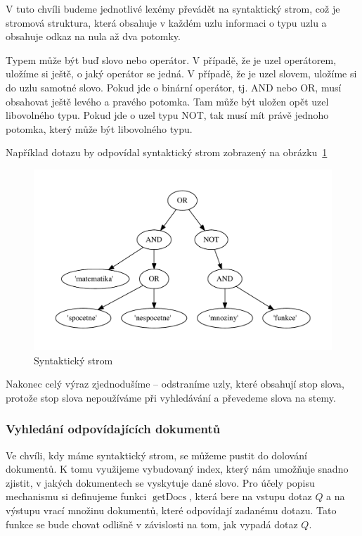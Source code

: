 \documentclass[12pt]{article}
\newcommand{\sssection}[1]{\subsubsection{#1}}
\DeclareMathOperator{\getdocs}{getDocs}
\begin{document}
V tuto chvíli budeme jednotlivé lexémy převádět na syntaktický strom, což je stromová struktura, která obsahuje v každém uzlu informaci o typu uzlu a obsahuje odkaz na nula až dva potomky. 

Typem může být buď slovo nebo operátor. V případě, že je uzel operátorem, uložíme si ještě, o jaký operátor se jedná. V případě, že je uzel slovem, uložíme si do uzlu samotné slovo. Pokud jde o binární operátor, tj. AND nebo OR, musí obsahovat ještě levého a pravého potomka. Tam může být uložen opět uzel libovolného typu. Pokud jde o uzel typu NOT, tak musí mít právě jednoho potomka, který může být libovolného typu. 

Například dotazu  by odpovídal syntaktický strom zobrazený na obrázku~\ref{fig:syntree}

\begin{figure}
  \centering
  \includegraphics[width=14cm]{obrazky/syntactic_tree.pdf}
  \caption{Syntaktický strom}
  \label{fig:syntree}
\end{figure}

Nakonec celý výraz zjednodušíme -- odstraníme uzly, které obsahují stop slova, protože stop slova nepoužíváme při vyhledávání a převedeme slova na stemy. 

\sssection{Vyhledání odpovídajících dokumentů}

Ve chvíli, kdy máme syntaktický strom, se můžeme pustit do dolování dokumentů. K tomu využijeme vybudovaný index, který nám umožňuje snadno zjistit, v jakých dokumentech se vyskytuje dané slovo. Pro účely popisu mechanismu si definujeme funkci $\getdocs$, která bere na vstupu dotaz $Q$ a na výstupu vrací množinu dokumentů, které odpovídají zadanému dotazu. Tato funkce se bude chovat odlišně v závislosti na tom, jak vypadá dotaz $Q$. 
\end{document}
